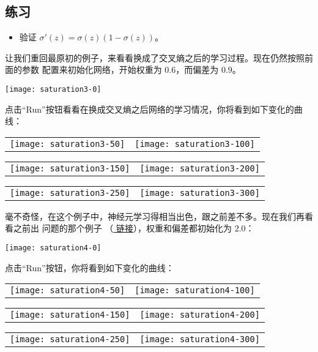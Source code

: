 \subsection*{练习}

\begin{itemize}
\item 验证 $\sigma'(z) = \sigma(z)(1-\sigma(z))$。
\end{itemize}

让我们重回最原初的例子，来看看换成了交叉熵之后的学习过程。现在仍然按照前面的参数
配置来初始化网络，开始权重为 $0.6$，而偏差为 $0.9$。
\begin{center}
  \texttt{[image: saturation3-0]}
\end{center}
点击“Run”按钮看看在换成交叉熵之后网络的学习情况，你将看到如下变化的曲线：
\begin{center}
  \begin{tabular}{ll}
    \texttt{[image: saturation3-50]} & \texttt{[image: saturation3-100]}\\
  \end{tabular}
  \begin{tabular}{ll}
    \texttt{[image: saturation3-150]} & \texttt{[image: saturation3-200]}\\
  \end{tabular}
  \begin{tabular}{ll}
    \texttt{[image: saturation3-250]} & \texttt{[image: saturation3-300]}
  \end{tabular}
\end{center}

毫不奇怪，在这个例子中，神经元学习得相当出色，跟之前差不多。现在我们再看看之前出
问题的那个例子
（\href{http://neuralnetworksanddeeplearning.com/chap3.html#saturation2_anchor}{
  链接}），权重和偏差都初始化为 $2.0$：
\begin{center}
  \texttt{[image: saturation4-0]}
\end{center}
点击“Run”按钮，你将看到如下变化的曲线：
\begin{center}
  \begin{tabular}{ll}
    \texttt{[image: saturation4-50]} & \texttt{[image: saturation4-100]}\\
  \end{tabular}
  \begin{tabular}{ll}
    \texttt{[image: saturation4-150]} & \texttt{[image: saturation4-200]}\\
  \end{tabular}
  \begin{tabular}{ll}
    \texttt{[image: saturation4-250]} & \texttt{[image: saturation4-300]}
  \end{tabular}
\end{center}

